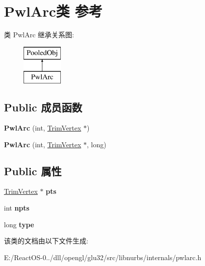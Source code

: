 \hypertarget{class_pwl_arc}{}\section{Pwl\+Arc类 参考}
\label{class_pwl_arc}
类 Pwl\+Arc 继承关系图\+:\begin{figure}[H]
\begin{center}
\leavevmode
\includegraphics[height=2.000000cm]{class_pwl_arc}
\end{center}
\end{figure}
\subsection*{Public 成员函数}
\begin{DoxyCompactItemize}
\item 
\mbox{\label{class_pwl_arc_abfa6bc69bab037ed93722a5cdf73a96c}} 
{\bfseries Pwl\+Arc} (int, \hyperlink{class_trim_vertex}{Trim\+Vertex} $\ast$)
\item 
\mbox{\label{class_pwl_arc_a02a57687e2260daf941c8431930e967e}} 
{\bfseries Pwl\+Arc} (int, \hyperlink{class_trim_vertex}{Trim\+Vertex} $\ast$, long)
\end{DoxyCompactItemize}
\subsection*{Public 属性}
\begin{DoxyCompactItemize}
\item 
\mbox{\label{class_pwl_arc_a3fb5646042f9756c153c04dfda1ae040}} 
\hyperlink{class_trim_vertex}{Trim\+Vertex} $\ast$ {\bfseries pts}
\item 
\mbox{\label{class_pwl_arc_a3a8406437bda2d18f6364633905e8059}} 
int {\bfseries npts}
\item 
\mbox{\label{class_pwl_arc_af9d07efa7be8e5bf916e471401a98f4c}} 
long {\bfseries type}
\end{DoxyCompactItemize}


该类的文档由以下文件生成\+:\begin{DoxyCompactItemize}
\item 
E\+:/\+React\+O\+S-\/0../dll/opengl/glu32/src/libnurbs/internals/pwlarc.\+h\end{DoxyCompactItemize}
